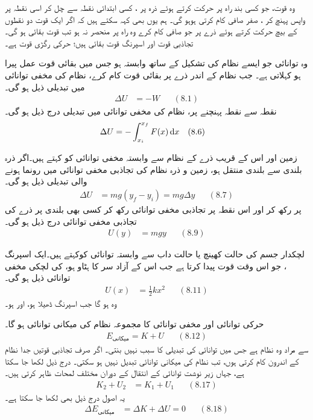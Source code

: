 وہ قوت،  جو کسی بند راہ  پر حرکت کرتے ہوئے ذرہ پر ، کسی ابتدائی نقطہ سے چل کر اسی نقطہ پر واپس پہنچ کر ، صفر صافی  کام کرتی ہوہو گی۔ ہم یوں بھی کہہ سکتے ہیں کہ  اگر ایک قوت  دو نقطوں کے بیچ حرکت کرتے ہوئے ذرے پر  جو صافی    کام کرے وہ  راہ پر منحصر نہ ہو تب  قوت بقائی ہو گی۔ تجاذبی قوت اور اسپرنگ قوت بقائی ہیں؛ حرکی رگڑی قوت  ہے۔

وہ توانائی جو  ایسے نظام کی تشکیل کے ساتھ  وابستہ ہو جس میں بقائی قوت عمل پیرا ہو  کہلاتی ہے۔ جب نظام کے اندر ذرے پر بقائی قوت   کام   کرے، نظام کی مخفی توانائی میں  تبدیلی     ذیل ہو گی۔
\begin{align*}
\Delta U&=-W &&(8.1)
\end{align*}
نقطہ  سے نقطہ   پہنچنے پر، نظام کی مخفی توانائی میں تبدیلی درج ذیل ہو گی۔
\begin{align*}
\Delta U&=-\int_{x_i}^{x_f}F(x)\dif x&&(8.6)
\end{align*}

زمین اور اس کے قریب ذرے کے نظام سے وابستہ  مخفی توانائی کو کہتے ہیں۔اگر ذرہ   بلندی سے  بلندی منتقل ہو، زمین و ذرہ نظام کی تجاذبی مخفی توانائی میں رونما ہونے والی تبدیلی ذیل ہو گی۔
\begin{align*}
\Delta U&=mg(y_f-y_i)=mg\Delta y && (8.7)
\end{align*}
  پر رکھ کر اور اس نقطہ پر تجاذبی مخفی توانائی  رکھ کر کسی بھی بلندی  پر ذرے کی تجاذبی مخفی توانائی درج ذیل ہو گی۔
\begin{align*}
U(y)&=mgy && (8.9)
\end{align*}

لچکدار جسم کی  حالت کھینچ یا حالت داب  سے وابستہ توانائی کوکہتے ہیں۔ایک   اسپرنگ    ، جو اس وقت  قوت  پیدا کرتا ہے جب اس کے آزاد سر کا ہٹاو  ہو، کی لچکی مخفی توانائی  ذیل ہو گی۔
\begin{align*}
U(x)&=\frac{1}{2}kx^2 && (8.11)
\end{align*}
وہ ہو گا جب اسپرنگ ڈھیلا ہو،   اور  ہو۔

حرکی توانائی  اور مخفی توانائی  کا مجموعہ نظام کی میکانی توانائی  ہو گا۔
\begin{align*}
E_{\text{میکانی}}=K+U && (8.12)
\end{align*}
سے مراد وہ نظام ہے جس میں توانائی کی تبدیلی کا سبب نہیں بنتی۔ اگر صرف تجاذبی قوتیں جدا نظام کے  اندرون  کام کرتی ہوں، تب نظام کی میکانی توانائی  تبدیل نہیں  ہو سکتی۔ درج ذیل لکھا جا سکتا ہے، جہاں زیر نوشت  توانائی کے انتقال  کے دوران  مختلف   لمحات ظاہر کرتی ہیں۔
\begin{align*}
K_2+U_2&=K_1+U_1 && (8.17)
\end{align*}
یہ اصول درج ذیل بھی لکھا جا سکتا ہے۔
\begin{align*}
\Delta E_{\text{میکانی}}&=\Delta K+\Delta U=0 && (8.18)
\end{align*}

